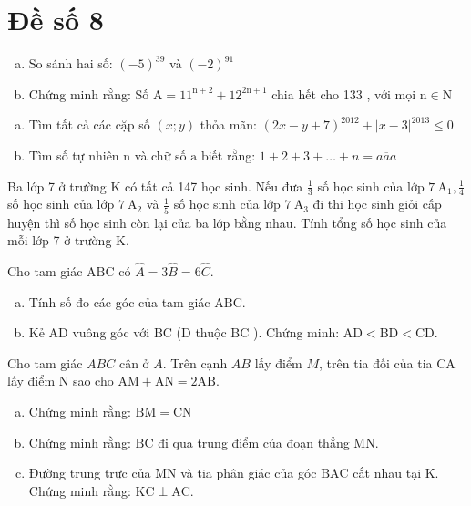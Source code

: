 \onehalfspacing
\section{Đề số 8}

\begin{bt} 
	\hfill
	\begin{enumerate}[a.]
		\item So sánh hai số: $(-5)^{39}$ và $(-2)^{91}$
		\item Chứng minh rằng: Số $\mathrm{A}=11^{\mathrm{n}+2}+12^{2 \mathrm{n}+1}$ chia hết cho 133 , với mọi $\mathrm{n} \in \mathrm{N}$
	\end{enumerate}
	\loigiai{} 
\end{bt}

\begin{bt}
	\hfill
	\begin{enumerate}[a.]
		\item Tìm tất cả các cặp số $(x ; y)$ thỏa mãn: $(2 x-y+7)^{2012}+|x-3|^{2013} \leq 0$
		\item Tìm số tự nhiên $\mathrm{n}$ và chữ số $\mathrm{a}$ biết rằng: $1+2+3+\ldots+n=\overline{a a a}$
	\end{enumerate}
	\loigiai{} 
\end{bt}

\begin{bt}
	Ba lớp 7 ở trường K có tất cả 147 học sinh. Nếu đưa $\frac{1}{3}$ số học sinh của lớp $7 \mathrm{~A}_1, \frac{1}{4}$ số học sinh của lớp $7 \mathrm{~A}_2$ và $\frac{1}{5}$ số học sinh của lớp $7 \mathrm{~A}_3$ đi thi học sinh giỏi cấp huyện thì số học sinh còn lại của ba lớp bằng nhau. Tính tổng số học sinh của mỗi lớp 7 ở trường K.
	\loigiai{} 
\end{bt}

\begin{bt}
	Cho tam giác $\mathrm{ABC}$ có $\hat{A}=3 \hat{B}=6 \hat{C}$.
	\begin{enumerate}[a.]
		\item Tính số đo các góc của tam giác $\mathrm{ABC}$.
		\item Kẻ $\mathrm{AD}$ vuông góc với $\mathrm{BC}$ (D thuộc $\mathrm{BC}$ ). Chứng minh: $\mathrm{AD}<\mathrm{BD}<\mathrm{CD}$.
	\end{enumerate}
	\loigiai{}
\end{bt}

\begin{bt}
	Cho tam giác $A B C$ cân ở $A$. Trên cạnh $A B$ lấy điểm $M$, trên tia đối của tia CA lấy điểm $\mathrm{N}$ sao cho $\mathrm{AM}+\mathrm{AN}=2 \mathrm{AB}$.
	\begin{enumerate}[a.]
		\item Chứng minh rằng: $\mathrm{BM}=\mathrm{CN}$
		\item Chứng minh rằng: $\mathrm{BC}$ đi qua trung điểm của đoạn thẳng $\mathrm{MN}$.
		\item Đường trung trực của $\mathrm{MN}$ và tia phân giác của góc $\mathrm{BAC}$ cắt nhau tại $\mathrm{K}$. Chứng minh rằng: $\mathrm{KC} \perp \mathrm{AC}$.
	\end{enumerate}
	\loigiai{}
\end{bt}